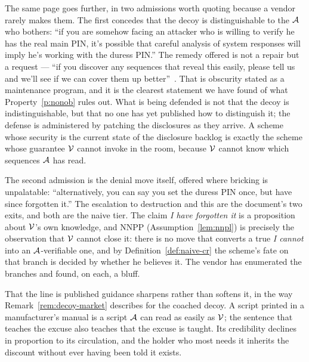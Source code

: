 \begin{remark}
The same page goes further, in two admissions worth quoting because a vendor
rarely makes them. The first concedes that the decoy is distinguishable to the
$\mathcal{A}$ who bothers: ``if you are somehow facing an attacker who is willing
to verify he has the real main PIN, it's possible that careful analysis of system
responses will imply he's working with the duress PIN.'' The remedy offered is
not a repair but a request --- ``if you discover any sequences that reveal this
easily, please tell us and we'll see if we can cover them up
better''~\cite{coldcard-pin-entry}. That is obscurity stated as a maintenance
program, and it is the clearest statement we have found of what
Property~\ref{p:nonob} rules out. What is being defended is not that the decoy is
indistinguishable, but that no one has yet published how to distinguish it; the
defense is administered by patching the disclosures as they arrive. A scheme
whose security is the current state of the disclosure backlog is exactly the
scheme whose guarantee $\mathcal{V}$ cannot invoke in the room, because $\mathcal{V}$
cannot know which sequences $\mathcal{A}$ has read.

The second admission is the denial move itself, offered where bricking is
unpalatable: ``alternatively, you can say you set the duress PIN once, but have
since forgotten it.'' The escalation to destruction and this are the document's
two exits, and both are the naive tier. The claim \emph{I have forgotten it} is a
proposition about $\mathcal{V}$'s own knowledge, and NNPP
(Assumption~\ref{lem:nnpl}) is precisely the observation that $\mathcal{V}$ cannot
close it: there is no move that converts a true \emph{I cannot} into an
$\mathcal{A}$-verifiable one, and by Definition~\ref{def:naive-cr} the scheme's
fate on that branch is decided by whether he believes it. The vendor has
enumerated the branches and found, on each, a bluff.

That the line is published guidance sharpens rather than softens it, in the way
Remark~\ref{rem:decoy-market} describes for the coached decoy. A script printed
in a manufacturer's manual is a script $\mathcal{A}$ can read as easily as
$\mathcal{V}$; the sentence that teaches the excuse also teaches that the excuse is
taught. Its credibility declines in proportion to its circulation, and the
holder who most needs it inherits the discount without ever having been told it
exists.
\end{remark}

